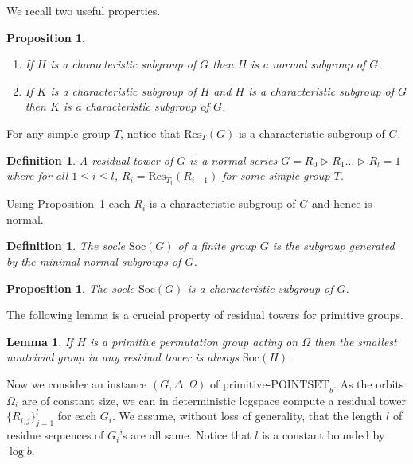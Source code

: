\documentclass[11pt]{article}
\newtheorem{lemma}[theorem]{Lemma}
\newtheorem{proposition}[theorem]{Proposition}
\newtheorem{definition}[theorem]{Definition}
\newcommand{\prpsb}[1]{\ensuremath{\textrm{primitive-POINTSET}_{#1}}}
\newcommand{\Res}[2]{\ensuremath{\mathrm{Res}_{#1}\left({#2}\right)}}
\newcommand{\Soc}[1]{\ensuremath{\mathrm{Soc}\left(#1\right)}}
\begin{document}
We recall two useful properties.

\begin{proposition}\label{prop-char-subgroup}
  \begin{enumerate}
  \item If $H$ is a characteristic subgroup of $G$ then $H$ is a normal
    subgroup of $G$.
  \item If $K$ is a characteristic subgroup of $H$ and $H$ is a
    characteristic subgroup of $G$ then $K$ is a characteristic
    subgroup of $G$.
\end{enumerate}
\end{proposition}

For any simple group $T$, notice that $\Res{T}{G}$ is a characteristic
subgroup of $G$.

\begin{definition}
  A \emph{residual tower} of $G$ is a normal series $G = R_0 \rhd R_1
  \ldots\rhd R_l = 1$ where for all $1 \leq i \leq l$, $R_i =
  \Res{T_i}{R_{i-1}}$ for some simple group $T$.
\end{definition}

Using Proposition~\ref{prop-char-subgroup} each $R_i$ is a
characteristic subgroup of $G$ and hence is normal.

\begin{definition}
  The \emph{socle} $\Soc{G}$ of a finite group $G$ is the subgroup
  generated by the minimal normal subgroups of $G$.
\end{definition}

\begin{proposition}
  The socle $\Soc{G}$ is a characteristic subgroup of $G$.
\end{proposition}

The following lemma is a crucial property of residual towers for
primitive groups.

\begin{lemma}{\rm\cite{luks}}\label{lem-smallest}
  If $H$ is a primitive permutation group acting on $\Omega$ then the
  smallest nontrivial group in any residual tower is always $\Soc{H}$.
\end{lemma}

Now we consider an instance $(G,\Delta,\Omega)$ of $\prpsb{b}$. As the
orbits $\Omega_i$ are of constant size, we can in deterministic
logspace compute a residual tower $\{ R_{i,j} \}_{j=1}^l$ for each
$G_i$. We assume, without loss of generality, that the length $l$ of
residue sequences of $G_i$'s are all same. Notice that $l$ is a
constant bounded by $\log b$.
\end{document}
